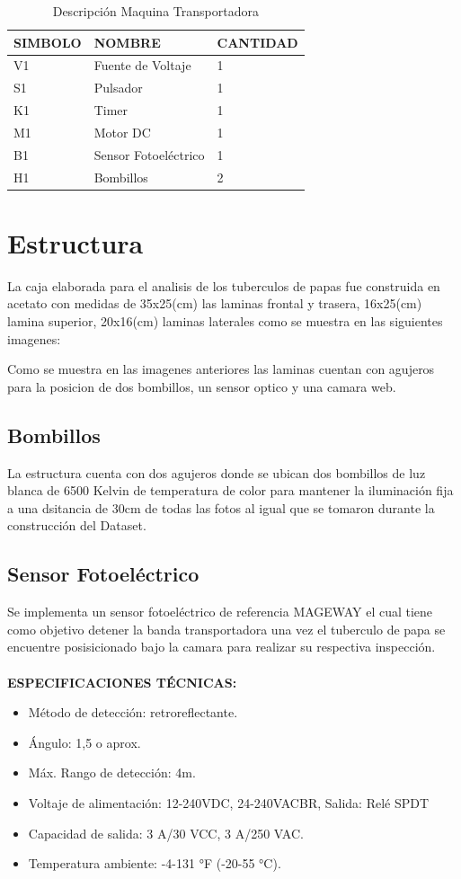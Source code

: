 		\begin{table}[ht]
		\centering
		\begin{tabular}{|p{2cm}|p{5cm}||p{3cm}|}
			\hline
			SIMBOLO & NOMBRE & CANTIDAD \\ 
			\hline
			 V1 & Fuente de Voltaje & 1 \\
			\hline
			 S1 & Pulsador & 1 \\
			\hline
			 K1 & Timer & 1 \\
			\hline
			 M1 & Motor DC & 1 \\
			\hline
			 B1 & Sensor Fotoeléctrico & 1 \\
			\hline
			 H1 & Bombillos & 2 \\
			\hline
		\end{tabular}	
		\caption{Descripción Maquina Transportadora}
		\label{table:esquema}
		\end{table}	
		
\newpage	
	\section{Estructura}
		La caja elaborada para el analisis de los tuberculos de papas fue construida en acetato con medidas de 35x25(cm) las laminas frontal y trasera, 16x25(cm) lamina superior, 20x16(cm) laminas laterales como se muestra en las siguientes imagenes:
	
		Como se muestra en las imagenes anteriores las laminas cuentan con agujeros para la posicion de dos bombillos, un sensor optico y una camara web.
		\subsection{Bombillos}
			La estructura cuenta con dos agujeros donde se ubican dos bombillos de luz blanca de 6500 Kelvin de temperatura de color para mantener la iluminación fija a una dsitancia de 30cm de todas las fotos al igual que se tomaron durante la construcción del Dataset.
		\subsection{Sensor Fotoeléctrico}
			Se implementa un sensor fotoeléctrico de referencia MAGEWAY el cual tiene como objetivo detener la banda transportadora una vez el tuberculo de papa se encuentre posisicionado bajo la camara para realizar su respectiva inspección.
			\\
			\\
			\textbf{ESPECIFICACIONES TÉCNICAS:}
				\begin{itemize}
					\item Método de detección: retroreflectante.
					\item Ángulo: 1,5 o aprox.
					\item Máx. Rango de detección: 4m.
					\item Voltaje de alimentación: 12-240VDC, 24-240VACBR, Salida: Relé SPDT
					\item Capacidad de salida: 3 A/30 VCC, 3 A/250 VAC.
					\item Temperatura ambiente: -4-131 °F (-20-55 °C).
				\end{itemize}
\newpage			
